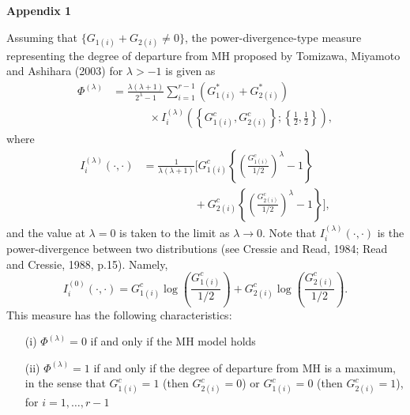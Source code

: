 \documentclass[a4j,12pt]{article}
\begin{document}
\newpage
\noindent \textbf{\large Appendix 1}

Assuming that $\{ G_{1(i)} + G_{2(i)} \neq 0 \}$, the power-divergence-type measure representing the degree of departure from MH proposed by Tomizawa, Miyamoto and Ashihara (2003) for $\lambda > -1$ is given as
\begin{equation}
\begin{split}
\Phi^{(\lambda)} &= \frac{\lambda(\lambda+1)}{2^{\lambda}-1} \sum^{r-1}_{i=1} \left( G^{\ast}_{1(i)} + G^{\ast}_{2(i)}\right) \\
& ~~~~~~~~~~~~~~~ \times I^{(\lambda)}_i \left( \left\{ G^c_{1(i)}, G^c_{2(i)} \right\} ; \left\{ \frac{1}{2}, \frac{1}{2} \right\} \right), \nonumber
\end{split}
\end{equation}
where
\begin{equation}
\begin{split}
I^{(\lambda)}_i (\cdot, \cdot) &= \frac{1}{\lambda(\lambda+1)} \Biggl[ G^c_{1(i)} \left\{ \left( \frac{G^c_{1(i)}}{1/2}\right)^{\lambda} - 1 \right\} \\
& ~~~~~~~~~~~~~~~~~~~~~ + G^c_{2(i)} \left\{ \left( \frac{G^c_{2(i)}}{1/2}\right)^{\lambda} - 1 \right\} \Biggr], \nonumber
\end{split}
\end{equation}
and the value at $\lambda=0$ is taken to the limit as $\lambda \rightarrow 0$. 
Note that $I^{(\lambda)}_i (\cdot, \cdot)$ is the power-divergence between two distributions (see Cressie and Read, 1984; Read and Cressie, 1988, p.15).
Namely, 
\[
I^{(0)}_i (\cdot, \cdot) = G^c_{1(i)} \log \left( \frac{G^c_{1(i)}}{1/2} \right) + G^c_{2(i)} \log \left( \frac{G^c_{2(i)}}{1/2} \right).
\]
This measure has the following characteristics: 
\begin{enumerate}
\item[(i)] $\Phi^{(\lambda)} = 0$ if and only if the MH model holds
\item[(ii)] $\Phi^{(\lambda)} = 1$ if and only if the degree of departure from MH is a maximum, in the sense that  $G^c_{1(i)}=1$ (then $G^c_{2(i)}=0$) or $G^c_{1(i)}=0$ (then $G^c_{2(i)}=1$), for $i = 1, \ldots, r-1$
\end{enumerate}
\end{document}
